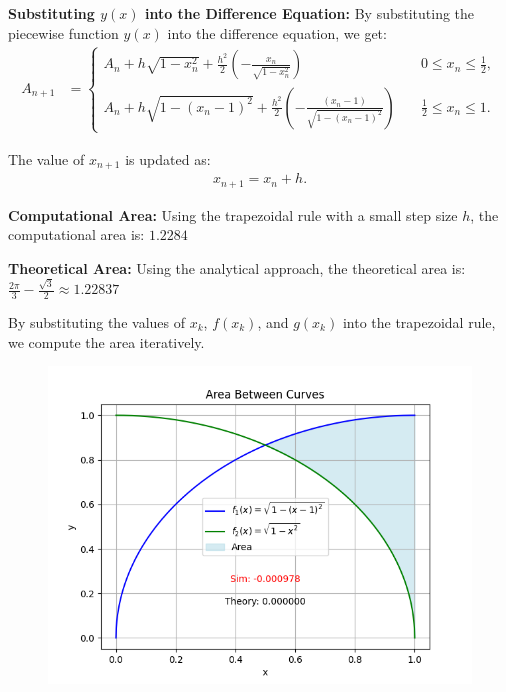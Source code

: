 \documentclass[journal]{IEEEtran}
\begin{document}
\textbf{Substituting \( y(x) \) into the Difference Equation:}
\newline
By substituting the piecewise function \( y(x) \) into the difference equation, we get:
\begin{align}
    A_{n + 1} &=
    \begin{cases}
        A_n + h \sqrt{1 - x_n^2} + \frac{h^2}{2} \left(-\frac{x_n}{\sqrt{1 - x_n^2}} \right) & \quad 0 \leq x_n \leq \frac{1}{2}, \\
        A_n + h \sqrt{1 - (x_n - 1)^2} + \frac{h^2}{2} \left(-\frac{(x_n - 1)}{\sqrt{1 - (x_n - 1)^2}} \right) & \quad \frac{1}{2} \leq x_n \leq 1.
    \end{cases}
\end{align}

The value of \( x_{n+1} \) is updated as:
\begin{align}
    x_{n+1} = x_n + h.
\end{align}

\textbf{Computational Area:}
\newline
Using the trapezoidal rule with a small step size \( h \), the computational area is: $1.2284$

\textbf{Theoretical Area:}
\newline
Using the analytical approach, the theoretical area is:$\frac{2\pi}{3} - \frac{\sqrt{3}}{2} \approx 1.22837$

By substituting the values of $x_k$, $f(x_k)$, and $g(x_k)$ into the trapezoidal rule, we compute the area iteratively.


\begin{figure}[h!]
    \centering
    \includegraphics[width=\columnwidth]{figs/fig.png} 
\end{figure}
\end{document}
